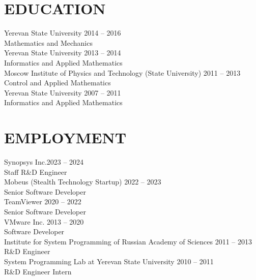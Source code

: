 \documentclass[10pt]{res}
\begin{document}
\begin{resume}


\section{EDUCATION}
\vspace{5pt}
	Yerevan State University \hfill 2014 -- 2016 \yearpostfix \\
	Mathematics and Mechanics \vspace{5pt} \\
	Yerevan State University \hfill 2013 -- 2014 \yearpostfix \\
	Informatics and Applied Mathematics \vspace{5pt} \\
	Moscow Institute of Physics and Technology (State University) \hfill 2011 -- 2013 \yearpostfix \\
	Control and Applied Mathematics \vspace{5pt} \\
	Yerevan State University \hfill 2007 -- 2011 \yearpostfix \\
	Informatics and Applied Mathematics

\section{EMPLOYMENT}
\vspace{5pt}
	Synopsys Inc.\hfill 2023 -- 2024 \yearpostfix \\ %
	Staff R\&D Engineer \vspace{5pt} \\
	Mobeus (Stealth Technology Startup) \hfill 2022 -- 2023 \yearpostfix \\ Senior Software Developer \vspace{5pt} \\
	TeamViewer \hfill 2020 -- 2022 \yearpostfix \\
	Senior Software Developer \vspace{5pt} \\
	VMware Inc. \hfill 2013 -- 2020 \yearpostfix \\
	Software Developer \vspace{5pt} \\
	Institute for System Programming of Russian Academy of Sciences \hfill 2011 -- 2013 \yearpostfix \\%
	R\&D Engineer \vspace{5pt} \\
	System Programming Lab at Yerevan State University \hfill 2010 -- 2011 \yearpostfix \\
	R\&D Engineer Intern


\end{resume}
\end{document}
